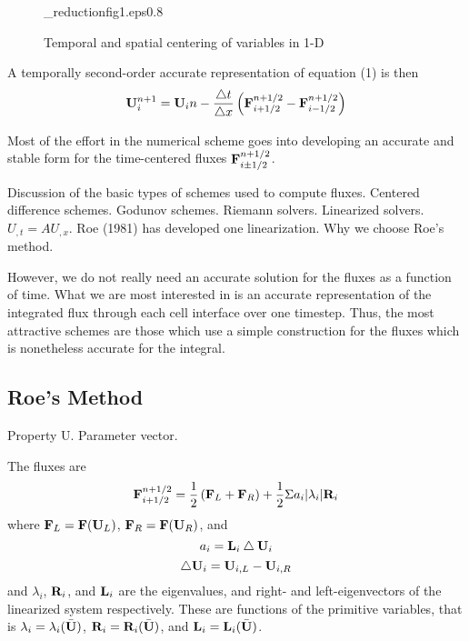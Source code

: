 \begin{figure}
\plotone_reduction{fig1.eps}{0.8}
\caption{Temporal and spatial centering of variables in 1-D}
\end{figure}

A temporally second-order accurate representation of equation (1) is then
\begin{equation}
  {\bf U}_{i}^{n+1} = {\bf U}_{i}{n} - 
\frac{\bigtriangleup t}{\bigtriangleup x}\left( {\bf F}_{i+1/2}^{n+1/2} - {\bf F}_{i-1/2}^{n+1/2} \right)
\end{equation}

Most of the effort in the numerical scheme goes into developing an
accurate and stable form for the time-centered fluxes 
${\bf F}_{i\pm 1/2}^{n+1/2}$.

Discussion of the basic types of schemes used to compute fluxes.
Centered difference schemes. Godunov schemes.  Riemann solvers.
Linearized solvers. $U_{,t} = AU_{,x}$.
Roe (1981) has developed one linearization.  Why we choose Roe's method.

However, we do not really need an accurate solution for the fluxes as a
function of time.  What we are most interested in is an accurate representation
of the integrated flux through each cell interface over one timestep.
Thus, the most attractive schemes are those which use a simple construction
for the fluxes which is nonetheless accurate for the integral.

\subsection{Roe's Method}

Property U.  Parameter vector.

The fluxes are
\begin{equation}
{\bf F}_{i+1/2}^{n+1/2} = \frac{1}{2} \left( {\bf F}_{L} + {\bf F}_{R} \right)
 + \frac{1}{2} \Sigma a_{i} | \lambda_{i} | {\bf R}_{i}
\end{equation}
where ${\bf F}_{L}={\bf F}({\bf U}_{L})$, ${\bf F}_{R}={\bf F}({\bf U}_{R})$,
and
\begin{equation}
  a_{i} = {\bf L}_{i} \bigtriangleup {\bf U}_{i}
\end{equation}
\begin{equation}
  \bigtriangleup {\bf U}_{i} = {\bf U}_{i,L} - {\bf U}_{i,R}
\end{equation}
and $\lambda_{i}$, ${\bf R}_{i}$, and ${\bf L}_{i}$ are the eigenvalues,
and right- and left-eigenvectors of the linearized system respectively.
These are functions of the primitive variables, that is
$\lambda_{i} = \lambda_{i}(\bar{\bf U})$,
${\bf R}_{i} = {\bf R}_{i}(\bar{\bf U})$, and
${\bf L}_{i} = {\bf L}_{i}(\bar{\bf U})$.

